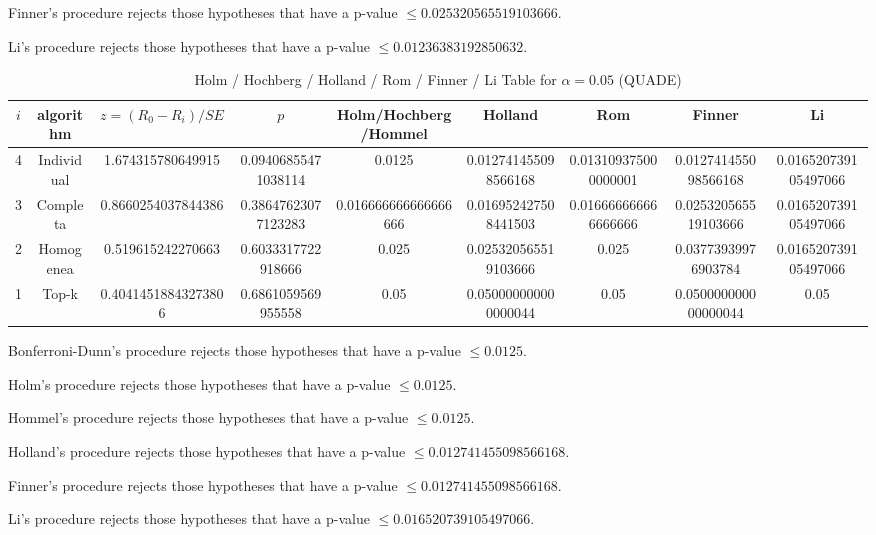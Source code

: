 \documentclass[a4paper,10pt]{article}
\begin{document}
\begin{landscape}
Finner's procedure rejects those hypotheses that have a p-value $\le0.025320565519103666$.


Li's procedure rejects those hypotheses that have a p-value $\le0.01236383192850632$.



\newpage

\begin{table}[!htp]
\centering\scriptsize
\caption{Holm / Hochberg / Holland / Rom / Finner / Li Table for $\alpha=0.05$ (QUADE)}
\begin{tabular}{ccccccccc}
$i$&algorithm&$z=(R_0 - R_i)/SE$&$p$&Holm/Hochberg/Hommel&Holland&Rom&Finner&Li\\
\hline
4&Individual&1.674315780649915&0.09406855471038114&0.0125&0.012741455098566168&0.013109375000000001&0.012741455098566168&0.016520739105497066\\
3&Completa&0.8660254037844386&0.38647623077123283&0.016666666666666666&0.016952427508441503&0.016666666666666666&0.025320565519103666&0.016520739105497066\\
2&Homogenea&0.519615242270663&0.6033317722918666&0.025&0.025320565519103666&0.025&0.03773939976903784&0.016520739105497066\\
1&Top-k&0.40414518843273806&0.6861059569955558&0.05&0.050000000000000044&0.05&0.050000000000000044&0.05\\
\hline
\end{tabular}
\end{table}
Bonferroni-Dunn's procedure rejects those hypotheses that have a p-value $\le0.0125$.


Holm's procedure rejects those hypotheses that have a p-value $\le0.0125$.


Hommel's procedure rejects those hypotheses that have a p-value $\le0.0125$.


Holland's procedure rejects those hypotheses that have a p-value $\le0.012741455098566168$.


Finner's procedure rejects those hypotheses that have a p-value $\le0.012741455098566168$.


Li's procedure rejects those hypotheses that have a p-value $\le0.016520739105497066$.



\newpage


\end{landscape}
\end{document}
